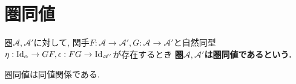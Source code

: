 \section{圏同値}
\begin{Def}
圏$\mathscr{A},\mathscr{A}'$に対して, 関手$F:\mathscr{A}\rightarrow\mathscr{A}', G:\mathscr{A}\rightarrow\mathscr{A}'$と自然同型$\eta:\mathrm{Id}_\alpha\rightarrow GF,\epsilon:FG\rightarrow\rm{Id}_{\mathscr{A}'}$が存在するとき
\bf{圏$\mathscr{A},\mathscr{A}'$は圏同値である}という.
\end{Def}
\begin{Prop}
圏同値は同値関係である.
\end{Prop}

\begin{comment}
\section{Haskにおける自然同型}
\subsection{mirror関数}
Tree関手からTree関手への自然同型
\subsection{Maybe関手とEither()関手の間の自然同型}
\section{まとめ}
aa
\end{comment}